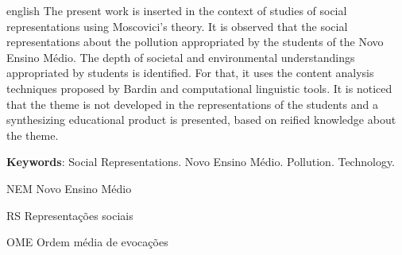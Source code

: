 \documentclass[
  12pt,       %
  openright,      %
  twoside,      %
  a4paper,      %
  english,      %
  french,       %
  spanish,      %
  brazil        %
  ]{abntex2}
\begin{document}
\begin{resumo}[Abstract]
 \begin{otherlanguage*}{english}
   The present work is inserted in the context of studies of social representations using Moscovici's theory. It is observed that the social representations about the pollution appropriated by the students of the Novo Ensino Médio. The depth of societal and environmental understandings appropriated by students is identified. For that, it uses the content analysis techniques proposed by Bardin and computational linguistic tools. It is noticed that the theme is not developed in the representations of the students and a synthesizing educational product is presented, based on reified knowledge about the theme.

   \vspace{\onelineskip}
 
   \noindent 
   \textbf{Keywords}: Social Representations. Novo Ensino Médio. Pollution. Technology.
 \end{otherlanguage*}
\end{resumo}



\listoffigures*
\cleardoublepage



\listofquadros

\begin{siglas}
  \item[NEM] Novo Ensino Médio
  \item[RS] Representações sociais
  \item[OME] Ordem média de evocações
\end{siglas}
\end{document}
